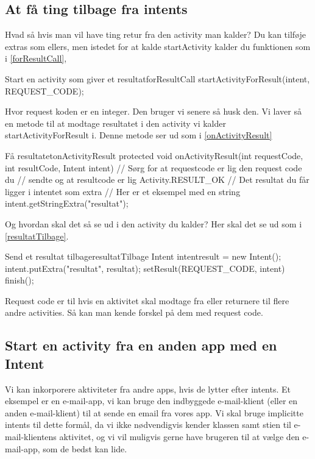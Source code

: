 \subsection{At få ting tilbage fra intents}
Hvad så hvis man vil have ting retur fra den activity man kalder? Du kan tilføje extras som ellers, men istedet for at kalde startActivity kalder du funktionen som i \autoref{forResultCall},
\begin{JavaCode}{Start en activity som giver et resultat}{forResultCall}
	startActivityForResult(intent, REQUEST_CODE);
\end{JavaCode}
Hvor request koden er en integer. Den bruger vi senere så husk den. Vi laver så en metode til at modtage resultatet i den activity vi kalder startActivityForResult i. Denne metode ser ud som i \autoref{onActivityResult}
\begin{JavaCode}{Få resultatet}{onActivityResult}
	protected void onActivityResult(int requestCode, 
									int resultCode, 
									Intent intent) {
		// Sørg for at requestcode er lig den request code du 
		// sendte og at resultcode er lig Activity.RESULT_OK
		// Det resultat du får ligger i intentet som extra
		// Her er et eksempel med en string
		intent.getStringExtra("resultat");
	}
\end{JavaCode}

Og hvordan skal det så se ud i den activity du kalder? Her skal det se ud som i \autoref{resultatTilbage}.
\begin{JavaCode}{Send et resultat tilbage}{resultatTilbage}
	Intent intentresult = new Intent();
	intent.putExtra("resultat", resultat);
	setResult(REQUEST_CODE, intent)
	finish();
\end{JavaCode}
Request code er til hvis en aktivitet skal modtage fra eller returnere til flere andre activities. Så kan man kende forskel på dem med request code. 

\subsection{Start en activity fra en anden app med en Intent}

Vi kan inkorporere aktiviteter fra andre apps, hvis de lytter efter intents. Et eksempel er en e-mail-app, vi kan bruge den indbyggede e-mail-klient (eller en anden e-mail-klient) til at sende en email fra vores app. Vi skal bruge implicitte intents til dette formål, da vi ikke nødvendigvis kender klassen samt stien til e-mail-klientens aktivitet, og vi vil muligvis gerne have brugeren til at vælge den e-mail-app, som de bedst kan lide.

